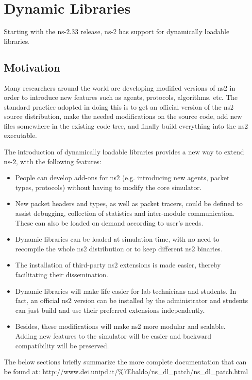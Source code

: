 \chapter{Dynamic Libraries}
\label{chap:dynlib}

Starting with the ns-2.33 release, ns-2 has support for dynamically
loadable libraries.  
\section{Motivation}
Many researchers around the world are developing 
modified versions of ns2 in order to introduce new features such as 
agents, protocols, algorithms, etc. The standard practice adopted in 
doing this is to get an official version of the ns2 source distribution, 
make the needed modifications on the source code, add new files 
somewhere in the existing code tree, and finally build everything 
into the ns2 executable.

The introduction of dynamically loadable libraries provides a new way
to extend ns-2, with the following features:
\begin{itemize}
    \item People can develop add-ons for ns2 (e.g. introducing new agents, 
packet types, protocols) without having to modify the core simulator.
    \item New packet headers and types, as well as packet tracers, could 
be defined to assist debugging, collection of statistics and inter-module 
communication. These can also be loaded on demand according to user's needs.
    \item Dynamic libraries can be loaded at simulation time, with no 
need to recompile the whole ns2 distribution or to keep different ns2 
binaries.
    \item The installation of third-party ns2 extensions is made easier, 
thereby facilitating their dissemination.
    \item Dynamic libraries will make life easier for lab technicians and 
students. In fact, an official ns2 version can be installed by the 
administrator and students can just build and use their preferred 
extensions independently.
    \item Besides, these modifications will make ns2 more modular and 
scalable. Adding new features to the simulator will be easier and 
backward compatibility will be preserved.
\end{itemize}

The below sections briefly summarize the more complete documentation
that can be found at:
http://www.dei.unipd.it/\%7Ebaldo/ns\_dl\_patch/ns\_dl\_patch.html

